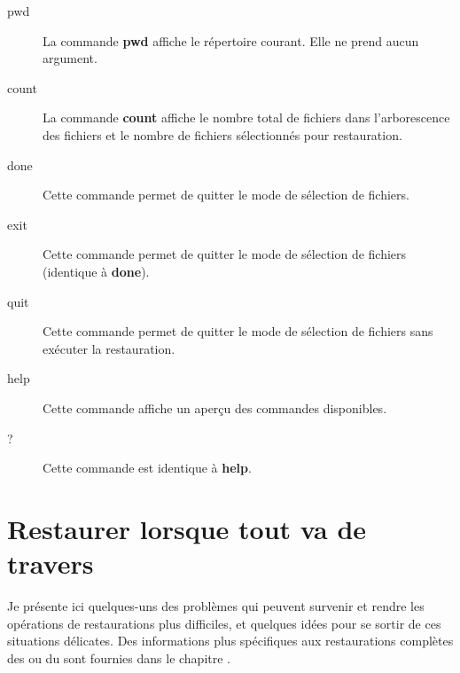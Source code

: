 \begin{description}
\item [pwd]
   La commande {\bf pwd} affiche le r\'epertoire courant. Elle ne prend aucun argument.

\item [count]
   La commande {\bf count} affiche le nombre total de fichiers dans l'arborescence des 
   fichiers et le nombre de fichiers s\'electionn\'es pour restauration.

\item [done]
   Cette commande permet de quitter le mode de s\'election de fichiers.

\item [exit]
   Cette commande permet de quitter le mode de s\'election de fichiers (identique \`a {\bf done}).

\item [quit]
   Cette commande permet de quitter le mode de s\'election de fichiers sans ex\'ecuter la restauration.

\item [help]
   Cette commande affiche un aper\c{c}u des commandes disponibles.

\item [?]
   Cette commande est identique \`a {\bf help}.
\end{description}

\label{database_restore}
\section{Restaurer lorsque tout va de travers}

Je pr\'esente ici quelques-uns des probl\`emes qui peuvent survenir et 
rendre les op\'erations de restaurations plus difficiles, et quelques id\'ees 
pour se sortir de ces situations d\'elicates. Des informations plus 
sp\'ecifiques aux restaurations compl\`etes des 
ou du  sont fournies dans le chapitre 
.

